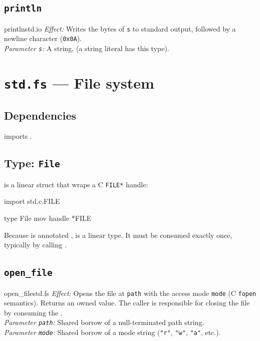 \subsection{\texttt{println}}
\label{sec:stdlib.io.println}

\begin{functionspec}{println}{std.io}
\noindent\textit{Effect:} Writes the bytes of \texttt{s} to standard output,
followed by a newline character (\texttt{0x0A}).\\
\noindent\textit{Parameter \texttt{s}:} A string,  (a string literal
has this type).
\end{functionspec}

\section{\texttt{std.fs} — File system}
\label{sec:stdlib.fs}

\subsection{Dependencies}
\label{sec:stdlib.fs.deps}

\pnum
{} imports .

\subsection{Type: \texttt{File}}
\label{sec:stdlib.fs.file}

\pnum
{} is a linear struct that wraps a C \texttt{FILE*} handle:

\begin{laincode}
import std.c.{FILE}

type File {
    mov handle *FILE
}
\end{laincode}

\pnum
Because  is annotated ,  is a linear
type.  It must be consumed exactly once, typically by calling
.

\subsection{\texttt{open\_file}}
\label{sec:stdlib.fs.open}

\begin{functionspec}{open\_file}{std.fs}
\noindent\textit{Effect:} Opens the file at \texttt{path} with the access
mode \texttt{mode} (C \texttt{fopen} semantics).  Returns an owned
 value.  The caller is responsible for closing the file by
consuming the .\\
\noindent\textit{Parameter \texttt{path}:} Shared borrow of a
null-terminated path string.\\
\noindent\textit{Parameter \texttt{mode}:} Shared borrow of a mode string
(\texttt{"r"}, \texttt{"w"}, \texttt{"a"}, etc.).
\end{functionspec}

